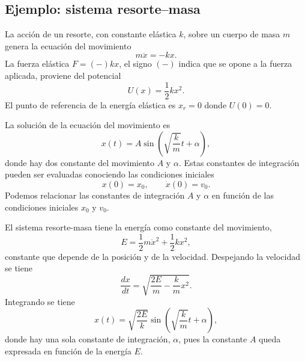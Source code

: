 \documentclass[../apunte_mecanica_clasica.tex]{subfiles}%
\begin{document}
\subsection{Ejemplo: sistema resorte--masa}

La acción de un resorte, con constante elástica $k$, sobre un cuerpo de masa $m$ genera la ecuación del movimiento
\begin{equation*}
    m\ddot x=-kx.
\end{equation*}
La fuerza elástica $F=(-)kx$, el signo $(-)$ indica que se opone a la fuerza aplicada, proviene del potencial
\begin{equation*}
    U(x)=\frac{1}{2}kx^2.
\end{equation*}
El punto de referencia de la energía elástica es $x_r=0$ donde $U(0)=0$.

La solución de la ecuación del movimiento es
\begin{equation*}
    x(t)=A\sin\left(\sqrt{\frac{k}{m}}t+\alpha\right),
\end{equation*}
donde hay dos constante del movimiento $A$ y $\alpha$. Estas constantes de integración pueden ser evaluadas conociendo las condiciones iniciales
\begin{equation*}
    x(0)=x_0,
    \qquad
    \dot x(0)=v_0.
\end{equation*}
Podemos relacionar las constantes de integración $A$ y $\alpha$ en función de las condiciones iniciales $x_0$ y $v_0$.

El sistema resorte-masa tiene la energía como constante del movimiento,
\begin{equation*}
    E=\frac{1}{2}m\dot x^2+\frac{1}{2}kx^2,
\end{equation*}
constante que depende de la posición y de la velocidad. Despejando la velocidad se tiene
\begin{equation*}
    \frac{dx}{dt}=\sqrt{\frac{2E}{m}-\frac{k}{m}x^2}.
\end{equation*}
Integrando se tiene
\begin{equation*}
    x(t)=\sqrt{\frac{2E}{k}}\sin\left(\sqrt{\frac{k}{m}}t+\alpha\right),
\end{equation*}
donde hay una sola constante de integración, $\alpha$, pues la constante $A$ queda expresada en función de la energía $E$.
\end{document}
